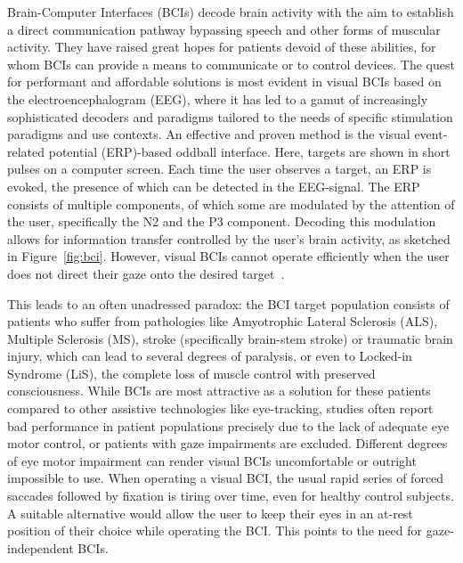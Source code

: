 Brain-Computer Interfaces (BCIs) decode brain activity with the aim to establish a direct communication
pathway bypassing speech and other forms of muscular activity. They have raised great hopes for patients
devoid of these abilities, for whom BCIs can provide a means to communicate or to
control devices.
The quest for performant and affordable solutions is most evident in
visual BCIs based on the electroencephalogram (EEG), where it has led to a gamut of increasingly sophisticated decoders
and paradigms tailored to the needs of specific stimulation paradigms and
use contexts.
An effective and proven method is the visual event-related potential (ERP)-based
oddball interface.
Here, targets are shown in short pulses on a computer screen.
Each time the user observes a target, an ERP is evoked, the presence of which can be
detected in the EEG-signal.
The ERP consists of multiple components, of which some are modulated by the
attention of the user, specifically the N2 and the P3 component.
Decoding this modulation allows for information transfer controlled by the
user's brain activity, as sketched in Figure~\ref{fig:bci}.
However, visual BCIs cannot operate efficiently when the user does not direct
their gaze onto the desired target~\cite{Brunner2010, Frenzel2011}.

This leads to an often unadressed paradox: the BCI target population consists
of patients who suffer from pathologies like Amyotrophic Lateral Sclerosis
(ALS), Multiple Sclerosis (MS), stroke (specifically
brain-stem stroke) or traumatic brain injury, which can lead to several degrees
of paralysis, or even to Locked-in Syndrome (LiS), the complete loss of muscle
control with preserved consciousness.
While BCIs are most attractive as a solution for these patients
compared to other assistive technologies like eye-tracking, studies often
report bad performance in patient populations precisely due to the lack of adequate eye motor
control, or patients with gaze impairments are excluded.
Different degrees of eye motor impairment can render visual BCIs
uncomfortable or outright impossible to use.
When operating a visual BCI, the usual rapid series of forced saccades followed
by fixation is tiring over time, even for healthy control subjects.
A suitable alternative would allow the user to keep their eyes in an at-rest
position of their choice while operating the BCI.
This points to the need for gaze-independent BCIs.

